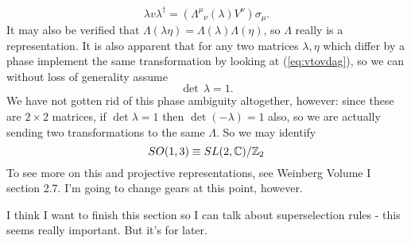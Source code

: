 \documentclass[main.tex]{subfiles}
\begin{document}
\[
\lambda v \lambda^\dagger = ({\Lambda^\mu}_\nu (\lambda) V^\nu)\sigma_\mu.
\]
It may also be verified that $\Lambda(\lambda \eta) = \Lambda(\lambda) \Lambda(\eta)$, so $\Lambda$ really is a representation. It is also apparent that for any two matrices $\lambda,\eta$ which differ by a phase implement the same transformation by looking at (\ref{eq:vtovdag}), so we can without loss of generality assume
\[
\det \, \lambda = 1.
\]
We have not gotten rid of this phase ambiguity altogether, however: since these are $2\times 2$ matrices, if $\det \lambda = 1$ then $\det (-\lambda) = 1$ also, so we are actually sending two transformations to the same $\Lambda$. So we may identify 
\[
SO(1,3) \equiv SL(2,\mathbb{C})/\mathbb{Z}_2
\]
To see more on this and projective representations, see Weinberg Volume I section 2.7. I'm going to change gears at this point, however.

I think I want to finish this section so I can talk about superselection rules - this seems really important. But it's for later.
\end{document}

